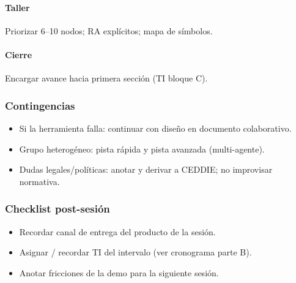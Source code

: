 \paragraph{Taller} Priorizar 6--10 nodos; RA explícitos; mapa de símbolos.
\paragraph{Cierre} Encargar avance hacia primera sección (TI bloque C).

\subsubsection*{Contingencias}
\begin{itemize}
\item Si la herramienta falla: continuar con diseño en documento colaborativo.
\item Grupo heterogéneo: pista rápida y pista avanzada (multi-agente).
\item Dudas legales/políticas: anotar y derivar a CEDDIE; no improvisar normativa.
\end{itemize}

\subsubsection*{Checklist post-sesión}
\begin{itemize}
\item[$\square$] Recordar canal de entrega del producto de la sesión.
\item[$\square$] Asignar / recordar TI del intervalo (ver cronograma parte B).
\item[$\square$] Anotar fricciones de la demo para la siguiente sesión.
\end{itemize}
